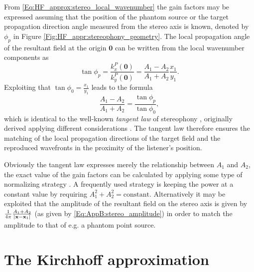 From \eqref{Eq:HF_approx:stereo_local_wavenumber} the gain factors may be expressed assuming that the position of the phantom source or the target propagation direction angle measured from the stereo axis is known, denoted by $\phi_p$ in Figure \eqref{Fig:HF_appr:stereophony_geometry}.
The local propagation angle of the resultant field at the origin $\mathbf{0}$ can be written from the local wavenumber components as
\begin{equation}
\tan \phi_p = \frac{k_x^P(\mathbf{0})}{k_y^P(\mathbf{0})} = \frac{A_1-A_2}{A_1+A_2}\frac{x_1}{y_1}.
\end{equation}
Exploiting that $\tan \phi_0 = \frac{x_1}{y_1}$ leads to the formula
\begin{equation}
\frac{A_1 - A_2}{A_1 + A_2} = \frac{\tan \phi_p}{\tan \phi_0},
\end{equation}
which is identical to the well-known \emph{tangent law} of stereophony \cite{SpringerHandbookSpeech2008, Pulkki1997, Pulkki2001a, Pulkki2001:phd}, originally derived applying different considerations \cite{Bennett1985}.
The tangent law therefore ensures the matching of the local propagation directions of the target field and the reproduced wavefronts in the proximity of the listener's position.

Obviously the tangent law expresses merely the relationship between $A_1$ and $A_2$, the exact value of the gain factors can be calculated by applying some type of normalizing strategy \cite{Moore1990}.
A frequently used strategy is keeping the power at a constant value by requiring $A_1^2 + A_2^2 = \text{constant}$.
Alternatively it may be exploited that the amplitude of the resultant field on the stereo axis is given by $\frac{1}{4\pi}\frac{A_1+A_2}{|\mathbf{x}-\mathbf{x}_1|}$ (as given by \eqref{Eq:AppB:stereo_amplitude}) in order to match the amplitude to that of e.g. a phantom point source.

\section{The Kirchhoff approximation}

